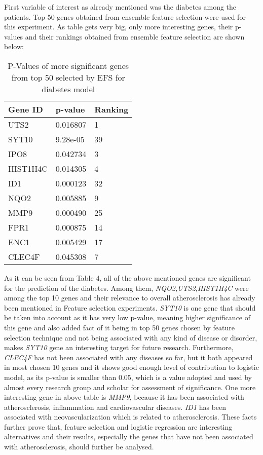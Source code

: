\documentclass{ba-kecs}
\numberwithin{figure}{section}
\numberwithin{equation}{section}
\begin{document}
First variable of interest as already mentioned was the diabetes among the patients. Top 50 genes obtained from ensemble feature selection were used for this experiment. As table gets very big, only more interesting genes, their p-values and their rankings obtained from ensemble feature selection are shown below:
\begin{table}
\centering
\begin{tabular}{|l|l|l|}
\hline
Gene ID & p-value & Ranking \\ \hline
UTS2 & 0.016807 & 1 \\ \hline
SYT10 & 9.28e-05 & 39 \\ \hline
IPO8 & 0.042734 & 3 \\ \hline
HIST1H4C & 0.014305 & 4 \\ \hline
ID1 & 0.000123 & 32 \\ \hline
NQO2 & 0.005885 & 9 \\ \hline
MMP9 & 0.000490 & 25 \\ \hline
FPR1 & 0.000875 & 14 \\ \hline
ENC1 & 0.005429 & 17 \\ \hline
CLEC4F & 0.045308 & 7 \\ \hline
\end{tabular}
\caption{P-Values of more significant genes from top 50 selected by EFS for diabetes model}
\end{table}

As it can be seen from Table 4, all of the above mentioned genes are significant for the prediction of the diabetes. Among them, \textit{NQO2,UTS2,HIST1H4C} were among the top 10 genes and their relevance to overall atherosclerosis has already been mentioned in Feature selection experiments. \textit{SYT10} is one gene that should be taken into account as it has very low p-value, meaning higher significance of this gene and also added fact of it being in top 50 genes chosen by feature selection technique and not being associated with any kind of disease or disorder, makes \textit{SYT10} gene an interesting target for future research. Furthermore, \textit{CLEC4F} has not been associated with any diseases so far, but it both appeared in most chosen 10 genes and it shows good enough level of contribution to logistic model, as its p-value is smaller than 0.05, which is a value adopted and used by almost every research group and scholar for assessment of significance. One more interesting gene in above table is \textit{MMP9}, because it has been associated with atherosclerosis, inflammation and cardiovascular diseases. \textit{ID1} has been associated with neovascularization which is related to atherosclerosis. These facts further prove that, feature selection and logistic regression are interesting alternatives and their results, especially the genes that have not been associated with atherosclerosis, should further be analysed.
\end{document}
